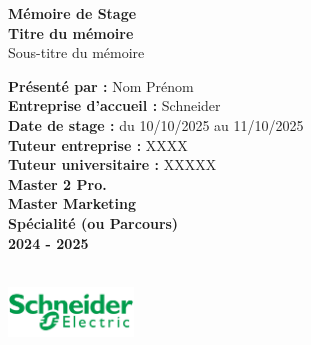 \begin{center}
    \vspace*{1.5cm}
        {\textbf{Mémoire de Stage}} \\[1cm]
        {\LARGE \textbf{Titre du mémoire}} \\[1cm]
        {\large Sous-titre du mémoire} \\[2cm]
        \begin{minipage}{0.5\textwidth}
            \raggedright
            \textbf{Présenté par :} Nom Prénom \\
            \textbf{Entreprise d'accueil :} Schneider \\
            \textbf{Date de stage :} du 10/10/2025 au 11/10/2025\\
            \textbf{Tuteur entreprise :} XXXX\\
            \textbf{Tuteur universitaire :} XXXXX \\[1cm]
        
            \textbf{Master 2 Pro.} \\
            \textbf{Master Marketing} \\
            \textbf{Spécialité (ou Parcours) }\\
            \textbf{2024 - 2025} \\
        \end{minipage} \\[2cm]
        
        \includegraphics[width=0.25\textwidth]{images/a0000-img002.png} \\
\end{center}
\newpage


